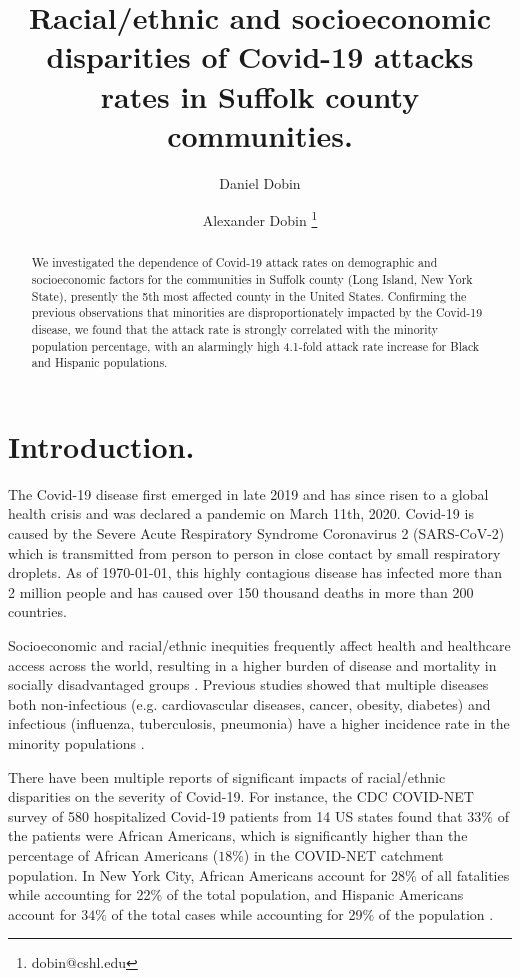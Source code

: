 \documentclass[twoside,12pt,onecolumn]{article}
\title{Racial/ethnic and socioeconomic disparities of Covid-19 attacks rates in Suffolk county communities.}
\author[1]{Daniel Dobin}
\author[2]{Alexander Dobin  \thanks{dobin@cshl.edu}}
\affil[1]{Candlewood Middle School, New York, USA}
\affil[2]{Cold Spring Harbor Laboratory, New York, USA}
\date{}
\begin{document}
\maketitle

\begin{abstract}
We investigated the dependence of Covid-19 attack rates on demographic and socioeconomic factors for the communities in Suffolk county (Long Island, New York State), presently the 5th most affected county in the United States. Confirming the previous observations that minorities are disproportionately impacted by the Covid-19 disease, we found that the attack rate is strongly correlated with the minority population percentage, with an alarmingly high 4.1-fold attack rate increase for Black and Hispanic populations.
\end{abstract}

\section{Introduction.}
The Covid-19 disease first emerged in late 2019 and has since risen to a global health crisis and was declared a pandemic on March 11th, 2020. Covid-19 is caused by the Severe Acute Respiratory Syndrome Coronavirus 2 (SARS-CoV-2) which is transmitted from person to person in close contact by small respiratory droplets. As of \today, this highly contagious disease has infected more than 2 million people and has caused over 150 thousand deaths in more than 200 countries.

Socioeconomic and racial/ethnic inequities frequently affect health and healthcare access across the world, resulting in a higher burden of disease and mortality in socially disadvantaged groups \cite{Braveman2010,Flores2010,Nesbitt2016,Williams2016}.
Previous studies showed that multiple diseases both non-infectious (e.g. cardiovascular diseases, cancer, obesity, diabetes) and infectious (influenza, tuberculosis, pneumonia) have a higher incidence rate in the minority populations \cite{Graham_heartDispar_2015,Ozdemir_cancerDispar_2017,Bhupathiraju_obesityDiabetes_2016,Quinn_influenza_2011,_tuberculosis_2004,Burton_pneumonia_2010}.

There have been multiple reports of significant impacts of racial/ethnic disparities on the severity of Covid-19. For instance, the CDC COVID-NET survey of 580 hospitalized Covid-19 patients from 14 US states \cite{COVID-NET_2020} found that $33\%$ of the patients were African Americans, which is significantly higher than the  percentage of African Americans ($18\%$) in the COVID-NET catchment population. In New York City, African Americans account for $28\%$ of all fatalities while accounting for 22\% of the total population, and Hispanic Americans account for $34\%$ of the total cases while accounting for 29\% of the population \cite{NYS_COVID19_tracker} .
\end{document}

